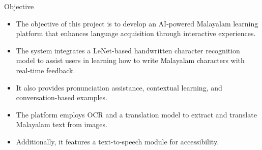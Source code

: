 \documentclass[aspectratio=169]{beamer}
\begin{document}
\begin{frame}{Objective}
    \begin{itemize}
        \item The objective of this project is to develop an AI-powered Malayalam learning platform that enhances language acquisition through interactive experiences.
        \item The system integrates a LeNet-based handwritten character recognition model to assist users in learning how to write Malayalam characters with real-time feedback.
        \item It also provides pronunciation assistance, contextual learning, and conversation-based examples.
        \item The platform employs OCR and a translation model to extract and translate Malayalam text from images.
        \item Additionally, it features a text-to-speech module for accessibility.
    \end{itemize}
\end{frame}
\end{document}
